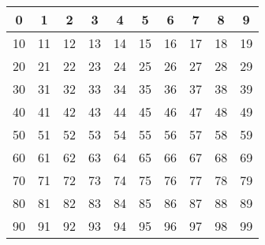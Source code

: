 \documentclass{article}
\begin{document}
\begin{table}
\begin{tabular}{|c|c|c|c|c|c|c|c|c|c|}
\hline
0&1&2&3&4&5&6&7&8&9\\
\hline
10&11&12&13&14&15&16&17&18&19\\
\hline
20&21&22&23&24&25&26&27&28&29\\
\hline
30&31&32&33&34&35&36&37&38&39\\
\hline
40&41&42&43&44&45&46&47&48&49\\
\hline
50&51&52&53&54&55&56&57&58&59\\
\hline
60&61&62&63&64&65&66&67&68&69\\
\hline
70&71&72&73&74&75&76&77&78&79\\
\hline
80&81&82&83&84&85&86&87&88&89\\
\hline
90&91&92&93&94&95&96&97&98&99\\
\hline
\end{tabular}
\end{table}
\end{document}
